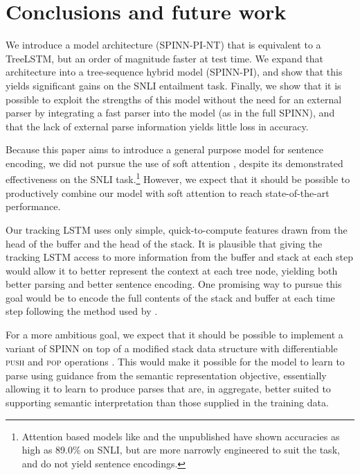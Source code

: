 \documentclass[11pt]{article}
\begin{document}
\section{Conclusions and future work}

We introduce a model architecture (SPINN-PI-NT) that is equivalent to a TreeLSTM, but an order of magnitude faster at test time. We expand that architecture into a tree-sequence hybrid model (SPINN-PI), and show that this yields significant gains on the SNLI entailment task. Finally, we show that it is possible to exploit the strengths of this model without the need for an external parser by integrating a fast parser into the model (as in the full SPINN), and that the lack of external parse information yields little loss in accuracy.

Because this paper aims to introduce a general purpose model for sentence encoding, we did not pursue the use of soft attention \citep{bahdanau2014neural,rocktaschel2015reasoning}, despite its demonstrated effectiveness on the SNLI task.\footnote{Attention based models like \citet{rocktaschel2015reasoning} and the unpublished \citet{cheng2016long} have shown accuracies as high as 89.0\% on SNLI, but are more narrowly engineered to suit the task, and do not yield sentence encodings.} However, we expect that it should be possible to productively combine our model with soft attention to reach state-of-the-art performance.

Our tracking LSTM uses only simple, quick-to-compute features drawn from the head of the buffer and the head of the stack. It is plausible that giving the tracking LSTM access to more information from the buffer and stack at each step would allow it to better represent the context at each tree node, yielding both better parsing and better sentence encoding. One promising way to pursue this goal would be to encode the full contents of the stack and buffer at each time step following the method used by \citet{dyer-EtAl:2015:ACL-IJCNLP}.

For a more ambitious goal, we expect that it should be possible to implement a variant of SPINN on top of a modified stack data structure with differentiable \textsc{push} and \textsc{pop} operations \citep[as in][]{grefenstette2015learning,joulin2015inferring}. This would make it possible for the model to learn to parse using guidance from the semantic representation objective, essentially allowing it to learn to produce parses that are, in aggregate, better suited to supporting semantic interpretation than those supplied in the training data. 

%    
 
 

 
\end{document}
